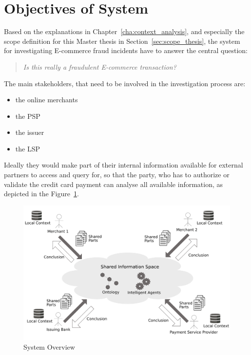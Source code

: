 
\section{Objectives of System}
\label{sec:system_objectives}

Based on the explanations in Chapter~\ref{cha:context_analysis}, and especially the scope definition for this Master thesis in Section~\ref{sec:scope_thesis}, the system for investigating E-commerce fraud incidents have to answer the central question:\@

\begin{quotation}
    \textit{Is this really a fraudulent E-commerce transaction?}
\end{quotation}

The main stakeholders, that need to be involved in the investigation process are:\@

\begin{itemize}
    \item the online merchants
    \item the \gls{PSP}
    \item the issuer
    \item the \gls{LSP}
\end{itemize}

Ideally they would make part of their internal information available for external partners to access and query for, so that the party, who has to authorize or validate the credit card payment can analyse all available information, as depicted in the Figure~\ref{fig:images_system_overview}.\@

\begin{figure}[H]
	\centering
		\includegraphics[width=0.8\columnwidth]{images/system_overview.pdf}
	\caption{System Overview}
\label{fig:images_system_overview}
\end{figure}

